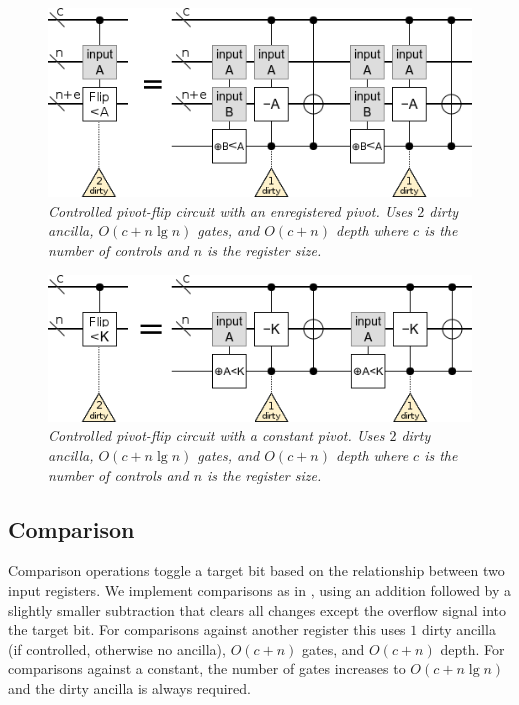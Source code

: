 \documentclass[twocolumn]{article}
\begin{document}
\begin{figure}
  \centering
  \includegraphics[width=\linewidth]{assets/controlled-pivot-flip.png}
  \caption{\em
    Controlled pivot-flip circuit with an enregistered pivot.
    Uses $2$ dirty ancilla, $O(c + n \lg n)$ gates, and $O(c + n)$ depth where $c$ is the number of controls and $n$ is the register size.
  }
  \label{fig:controlled-pivot-flip}
\end{figure}

\begin{figure}
  \centering
  \includegraphics[width=\linewidth]{assets/controlled-const-pivot-flip.png}
  \caption{\em
    Controlled pivot-flip circuit with a constant pivot.
    Uses $2$ dirty ancilla, $O(c + n \lg n)$ gates, and $O(c + n)$ depth where $c$ is the number of controls and $n$ is the register size.
  }
  \label{fig:controlled-const-pivot-flip}
\end{figure}


\subsection{Comparison}

Comparison operations toggle a target bit based on the relationship between two input registers.
We implement comparisons as in \cite{takahashi2005}, using an addition followed by a slightly smaller subtraction that clears all changes except the overflow signal into the target bit.
For comparisons against another register this uses $1$ dirty ancilla (if controlled, otherwise no ancilla), $O(c + n)$ gates, and $O(c + n)$ depth.
For comparisons against a constant, the number of gates increases to $O(c + n \lg n)$ and the dirty ancilla is always required.
\end{document}
